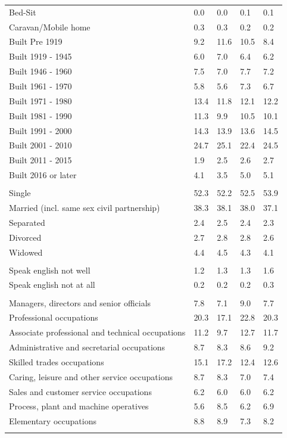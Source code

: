 \documentclass{article}
\begin{document}
\begin{table}[h]
\begin{tabular}{KTTTT}
Bed-Sit & 0.0& 0.0& 0.1& 0.1\\
Caravan/Mobile home & 0.3& 0.3& 0.2& 0.2\\
    \hline
Built Pre 1919 &  9.2& 11.6& 10.5&  8.4\\
Built 1919 - 1945 & 6.0& 7.0& 6.4& 6.2\\
Built  1946 - 1960 & 7.5& 7.0& 7.7& 7.2\\
Built  1961 - 1970 & 5.8& 5.6& 7.3& 6.7\\
Built  1971 - 1980 & 13.4& 11.8& 12.1& 12.2\\
Built  1981 - 1990 & 11.3&  9.9& 10.5& 10.1\\
Built  1991 - 2000 & 14.3& 13.9& 13.6& 14.5\\
Built  2001 - 2010 & 24.7& 25.1& 22.4& 24.5\\
Built  2011 - 2015 & 1.9& 2.5& 2.6& 2.7\\
Built  2016 or later & 4.1& 3.5& 5.0& 5.1\\
\hline
    \\
    \hline
Single & 52.3& 52.2& 52.5& 53.9\\
Married (incl. same sex civil partnership) & 38.3& 38.1& 38.0& 37.1\\
Separated  & 2.4& 2.5& 2.4& 2.3\\
Divorced  & 2.7& 2.8& 2.8& 2.6\\
Widowed & 4.4& 4.5& 4.3& 4.1\\
\hline
    \\ 
    \hline
Speak english not well & 1.2& 1.3& 1.3& 1.6\\
Speak english not at all & 0.2& 0.2& 0.2& 0.3\\
\hline
    \\
    \hline
Managers, directors and senior officials & 7.8& 7.1& 9.0& 7.7\\
Professional occupations & 20.3& 17.1& 22.8& 20.3\\
Associate professional and technical occupations & 11.2&  9.7& 12.7& 11.7\\
Administrative and secretarial occupations & 8.7& 8.3& 8.6& 9.2\\
Skilled trades occupations & 15.1& 17.2& 12.4& 12.6\\
Caring, leisure and other service occupations & 8.7& 8.3& 7.0& 7.4\\
Sales and customer service occupations & 6.2& 6.0& 6.0& 6.2\\
Process, plant and machine operatives & 5.6& 8.5& 6.2& 6.9\\
Elementary occupations & 8.8& 8.9& 7.3& 8.2\\
\hline
\end{tabular}
\end{table}
\end{document}
